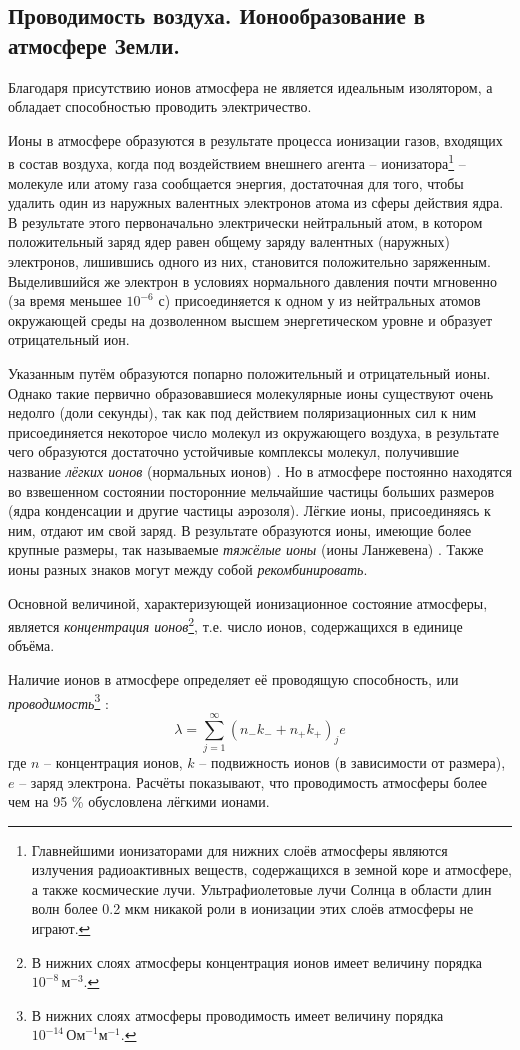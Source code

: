 \subsection{Проводимость воздуха. Ионообразование в атмосфере Земли.}
Благодаря присутствию ионов атмосфера не является идеальным изолятором, а обладает способностью проводить электричество.

Ионы в атмосфере образуются в результате процесса ионизации газов, входящих в состав воздуха, когда под воздействием внешнего агента -- ионизатора\footnote{Главнейшими ионизаторами для нижних слоёв атмосферы являются излучения радиоактивных веществ, содержащихся в земной коре и атмосфере, а также космические лучи. Ультрафиолетовые лучи Солнца в области длин волн более 0.2 мкм никакой роли в ионизации этих слоёв атмосферы не играют.} -- молекуле или атому газа сообщается энергия, достаточная для того, чтобы удалить один из наружных валентных электронов атома из сферы действия ядра.
В результате этого первоначально электрически нейтральный атом, в котором положительный заряд ядер равен общему заряду валентных (наружных) электронов, лишившись одного из них, становится положительно заряженным.
Выделившийся же электрон в условиях нормального давления почти мгновенно (за время меньшее $10^{-6}$ с) присоединяется к одном у из нейтральных атомов окружающей среды на дозволенном высшем энергетическом уровне и образует отрицательный ион.

Указанным путём образуются попарно положительный и отрицательный ионы.
Однако такие первично образовавшиеся молекулярные ионы существуют очень недолго (доли секунды), так как под действием поляризационных сил к ним присоединяется некоторое число молекул из окружающего воздуха, в результате чего образуются достаточно устойчивые комплексы молекул, получившие название \textit{лёгких ионов} (нормальных ионов) \cite{Кашлева-2008}.
Но в атмосфере постоянно находятся во взвешенном состоянии посторонние мельчайшие частицы больших размеров (ядра конденсации и другие частицы аэрозоля).
Лёгкие ионы, присоединяясь к ним, отдают им свой заряд.
В результате образуются ионы, имеющие более крупные размеры, так называемые \textit{тяжёлые ионы} (ионы Ланжевена) \cite{Кашлева-2008}.
Также ионы разных знаков могут между собой \textit{рекомбинировать}.

Основной величиной, характеризующей ионизационное состояние атмосферы, является \textit{концентрация ионов}\footnote{В нижних слоях атмосферы концентрация ионов имеет величину порядка $10^{-8}\,\text{м}^{-3}$.}, т.е. число ионов, содержащихся в единице объёма.

Наличие ионов в атмосфере определяет её проводящую способность, или \textit{проводимость}\footnote{В нижних слоях атмосферы проводимость имеет величину порядка $10^{-14}\,\text{Ом}^{-1}\text{м}^{-1}$.} \cite{Кашлева-2008}:
\begin{equation}
\lambda=\sum_{j=1}^\infty\left(n_{-}k_{-}+n_{+}k_{+}\right)_{j}e
\end{equation}
где $n$ -- концентрация ионов, $k$ -- подвижность ионов (в зависимости от размера), $e$ -- заряд электрона.
Расчёты показывают, что проводимость атмосферы более чем на 95 \% обусловлена лёгкими ионами.
